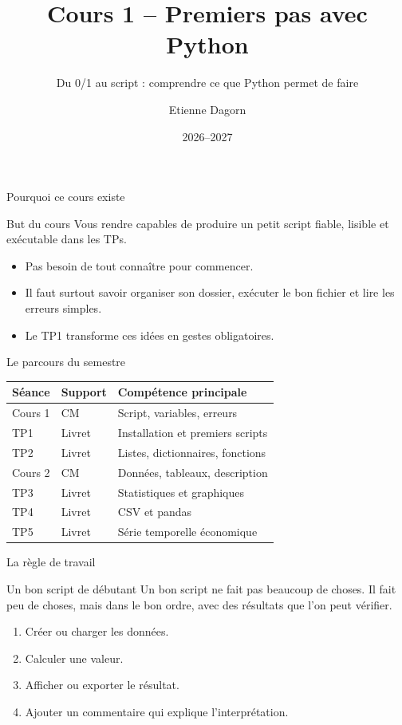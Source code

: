 \documentclass[10pt,aspectratio=169]{beamer}
\title{Cours 1 -- Premiers pas avec Python}
\subtitle{Du 0/1 au script : comprendre ce que Python permet de faire}
\author{Etienne Dagorn}
\institute{Université de Lille -- L2 Économie}
\date{2026--2027}
\begin{document}
\begin{frame}
  \titlepage
\end{frame}

\begin{frame}{Pourquoi ce cours existe}
\begin{block}{But du cours}
Vous rendre capables de produire un petit script fiable, lisible et exécutable dans les TPs.
\end{block}
\begin{itemize}
  \item Pas besoin de tout connaître pour commencer.
  \item Il faut surtout savoir organiser son dossier, exécuter le bon fichier et lire les erreurs simples.
  \item Le TP1 transforme ces idées en gestes obligatoires.
\end{itemize}
\end{frame}

\begin{frame}{Le parcours du semestre}
\begin{tabular}{@{}lll@{}}
\toprule
Séance & Support & Compétence principale \\
\midrule
Cours 1 & CM & Script, variables, erreurs \\
TP1 & Livret & Installation et premiers scripts \\
TP2 & Livret & Listes, dictionnaires, fonctions \\
Cours 2 & CM & Données, tableaux, description \\
TP3 & Livret & Statistiques et graphiques \\
TP4 & Livret & CSV et pandas \\
TP5 & Livret & Série temporelle économique \\
\bottomrule
\end{tabular}
\end{frame}

\begin{frame}{La règle de travail}
\begin{block}{Un bon script de débutant}
Un bon script ne fait pas beaucoup de choses. Il fait peu de choses, mais dans le bon ordre, avec des résultats que l'on peut vérifier.
\end{block}
\begin{enumerate}
  \item Créer ou charger les données.
  \item Calculer une valeur.
  \item Afficher ou exporter le résultat.
  \item Ajouter un commentaire qui explique l'interprétation.
\end{enumerate}
\end{frame}
\end{document}
